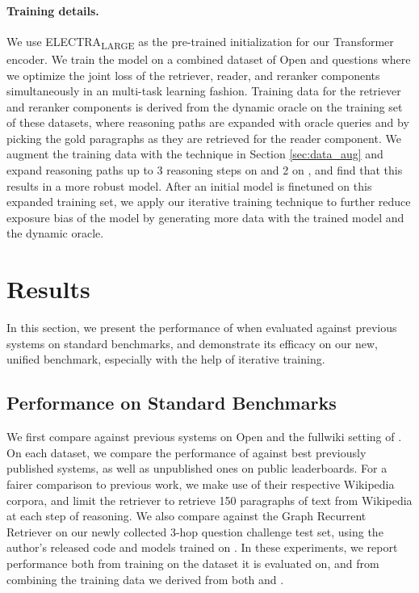 \paragraph{Training details.} We use ELECTRA\textsubscript{LARGE} \citep{clark2020electra} as the pre-trained initialization for our Transformer encoder. 
We train the model on a combined dataset of \squad{} Open and \hotpotqa{} questions where we optimize the joint loss of the retriever, reader, and reranker components simultaneously in an multi-task learning fashion.
Training data for the retriever and reranker components is derived from the dynamic oracle on the training set of these datasets, where reasoning paths are expanded with oracle queries and by picking the gold paragraphs as they are retrieved for the reader component.
We augment the training data with the technique in Section \ref{sec:data_aug} and expand reasoning paths up to 3 reasoning steps on \hotpotqa{} and 2 on \squadopen{}, and find that this results in a more robust model.
After an initial model is finetuned on this expanded training set, we apply our iterative training technique to further reduce exposure bias of the model by generating more data with the trained model and the dynamic oracle.

\section{Results}

In this section, we present the performance of \irrr{} when evaluated against previous systems on standard benchmarks, and demonstrate its efficacy on our new, unified benchmark, especially with the help of iterative training.

\subsection{Performance on Standard Benchmarks}

We first compare \irrr{} against previous systems on \squad{} Open and the fullwiki setting of \hotpotqa{}. %
On each dataset, we compare the performance of \irrr{} against best previously published systems, as well as unpublished ones on public leaderboards.
For a fairer comparison to previous work, we make use of their respective Wikipedia corpora, and limit the retriever to retrieve 150 paragraphs of text from Wikipedia at each step of reasoning.
We also compare \irrr{} against the Graph Recurrent Retriever \citep[GRR;][]{asai2020learning} on our newly collected 3-hop question challenge test set, using the author's released code and models trained on \hotpotqa{}.
In these experiments, we report \irrr{} performance both from training on the dataset it is evaluated on, and from combining the training data we derived from both \squadopen{} and \hotpotqa{}.

